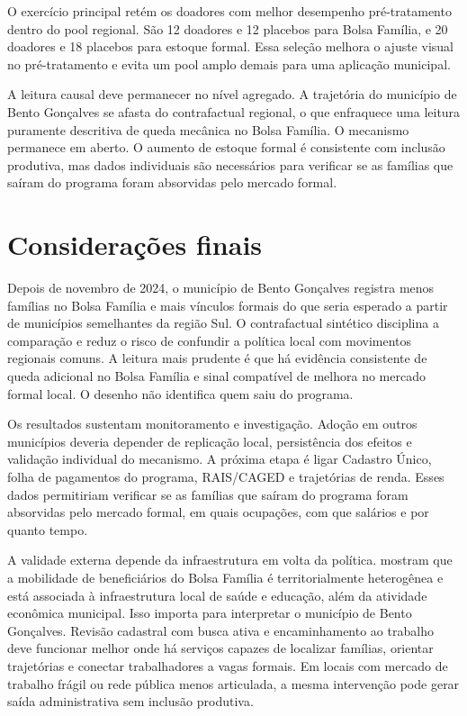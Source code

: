 \documentclass[10pt]{article}
\begin{document}
O exercício principal retém os doadores com melhor desempenho pré-tratamento dentro do pool regional. São 12 doadores e 12 placebos para Bolsa Família, e 20 doadores e 18 placebos para estoque formal. Essa seleção melhora o ajuste visual no pré-tratamento e evita um pool amplo demais para uma aplicação municipal.

A leitura causal deve permanecer no nível agregado. A trajetória do município de Bento Gonçalves se afasta do contrafactual regional, o que enfraquece uma leitura puramente descritiva de queda mecânica no Bolsa Família. O mecanismo permanece em aberto. O aumento de estoque formal é consistente com inclusão produtiva, mas dados individuais são necessários para verificar se as famílias que saíram do programa foram absorvidas pelo mercado formal.

\section{Considerações finais}

Depois de novembro de 2024, o município de Bento Gonçalves registra menos famílias no Bolsa Família e mais vínculos formais do que seria esperado a partir de municípios semelhantes da região Sul. O contrafactual sintético disciplina a comparação e reduz o risco de confundir a política local com movimentos regionais comuns. A leitura mais prudente é que há evidência consistente de queda adicional no Bolsa Família e sinal compatível de melhora no mercado formal local. O desenho não identifica quem saiu do programa.

Os resultados sustentam monitoramento e investigação. Adoção em outros municípios deveria depender de replicação local, persistência dos efeitos e validação individual do mecanismo. A próxima etapa é ligar Cadastro Único, folha de pagamentos do programa, RAIS/CAGED e trajetórias de renda. Esses dados permitiriam verificar se as famílias que saíram do programa foram absorvidas pelo mercado formal, em quais ocupações, com que salários e por quanto tempo.

A validade externa depende da infraestrutura em volta da política. \citet{fassarella2024mobility} mostram que a mobilidade de beneficiários do Bolsa Família é territorialmente heterogênea e está associada à infraestrutura local de saúde e educação, além da atividade econômica municipal. Isso importa para interpretar o município de Bento Gonçalves. Revisão cadastral com busca ativa e encaminhamento ao trabalho deve funcionar melhor onde há serviços capazes de localizar famílias, orientar trajetórias e conectar trabalhadores a vagas formais. Em locais com mercado de trabalho frágil ou rede pública menos articulada, a mesma intervenção pode gerar saída administrativa sem inclusão produtiva.
\end{document}
